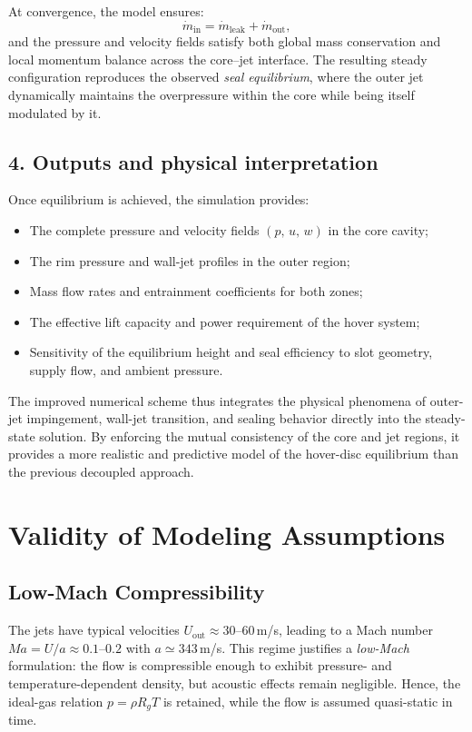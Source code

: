 \documentclass[11pt,a4paper]{article}
\begin{document}
At convergence, the model ensures:
\begin{equation}
\dot{m}_\text{in} = \dot{m}_\text{leak} + \dot{m}_\text{out},
\end{equation}
and the pressure and velocity fields satisfy both global mass conservation and local momentum balance across the core–jet interface. The resulting steady configuration reproduces the observed \textit{seal equilibrium}, where the outer jet dynamically maintains the overpressure within the core while being itself modulated by it.

\subsection*{4. Outputs and physical interpretation}

Once equilibrium is achieved, the simulation provides:
\begin{itemize}
  \item The complete pressure and velocity fields $(p,\,u,\,w)$ in the core cavity;
  \item The rim pressure and wall-jet profiles in the outer region;
  \item Mass flow rates and entrainment coefficients for both zones;
  \item The effective lift capacity and power requirement of the hover system;
  \item Sensitivity of the equilibrium height and seal efficiency to slot geometry, supply flow, and ambient pressure.
\end{itemize}

The improved numerical scheme thus integrates the physical phenomena of outer-jet impingement, wall-jet transition, and sealing behavior directly into the steady-state solution. By enforcing the mutual consistency of the core and jet regions, it provides a more realistic and predictive model of the hover-disc equilibrium than the previous decoupled approach.



\section{Validity of Modeling Assumptions}
\label{sec:validity-of-modeling-assumptions}

\subsection{Low-Mach Compressibility}
The jets have typical velocities $U_{\mathrm{out}}\approx30$--$60\,$m/s, leading to a Mach number $Ma=U/a\approx0.1$--$0.2$ with $a\simeq343\,$m/s.
This regime justifies a \emph{low-Mach} formulation: the flow is compressible enough to exhibit pressure- and temperature-dependent density, but acoustic effects remain negligible.
Hence, the ideal-gas relation $p=\rho R_g T$ is retained, while the flow is assumed quasi-static in time.
\end{document}
